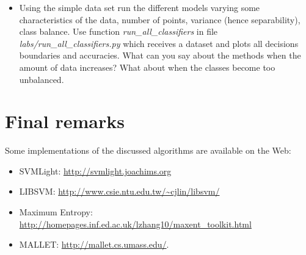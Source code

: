 \begin{exercise}
\begin{itemize}
\item Using the simple data set run the different models varying some
  characteristics of the data, number of points, variance (hence
  separability), class balance. Use function
  \emph{run\_all\_classifiers} in file \emph{labs/run\_all\_classifiers.py} which receives a
  dataset and plots all decisions boundaries and accuracies. What can
  you say about the methods when the amount of data increases? What
  about when the classes become too unbalanced.
\end{itemize}
\end{exercise}


\section{Final remarks}


Some implementations of the discussed algorithms are available on the Web: 
\begin{itemize}
\item SVMLight: \url{http://svmlight.joachims.org}
\item LIBSVM: \url{http://www.csie.ntu.edu.tw/~cjlin/libsvm/}
\item Maximum Entropy: \url{http://homepages.inf.ed.ac.uk/lzhang10/maxent_toolkit.html}
\item MALLET: \url{http://mallet.cs.umass.edu/}.
\end{itemize} 


